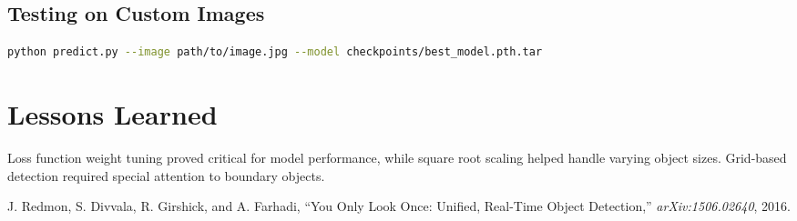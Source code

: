 \documentclass[conference]{IEEEtran}
\begin{document}
\subsection{Testing on Custom Images}
\begin{lstlisting}[language=bash]
python predict.py --image path/to/image.jpg --model checkpoints/best_model.pth.tar
\end{lstlisting}

\section{Lessons Learned}
Loss function weight tuning proved critical for model performance, while square root scaling helped handle varying object sizes. Grid-based detection required special attention to boundary objects.

\begin{thebibliography}{9}
J. Redmon, S. Divvala, R. Girshick, and A. Farhadi,
``You Only Look Once: Unified, Real-Time Object Detection,''
\textit{arXiv:1506.02640}, 2016.
\end{thebibliography}
\end{document}
